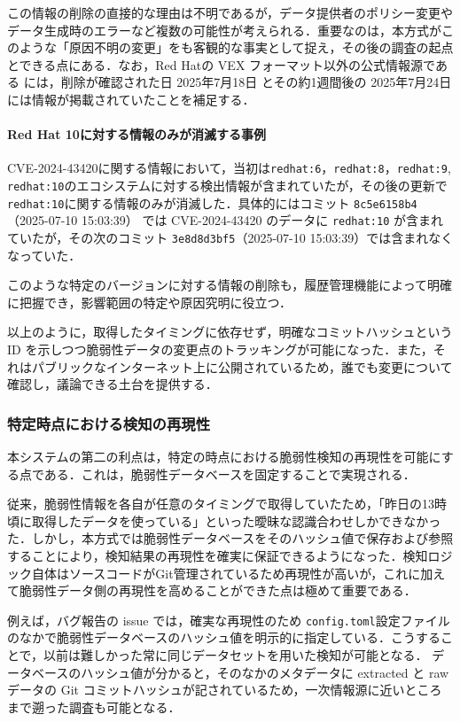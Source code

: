 この情報の削除の直接的な理由は不明であるが，データ提供者のポリシー変更やデータ生成時のエラーなど複数の可能性が考えられる．重要なのは，本方式がこのような「原因不明の変更」をも客観的な事実として捉え，その後の調査の起点とできる点にある．なお，Red Hatの VEX フォーマット以外の公式情報源である \cite{rh-cve-2024-24791-1} \cite{rh-cve-2024-24791-2} には，削除が確認された日 2025年7月18日 とその約1週間後の 2025年7月24日には情報が掲載されていたことを補足する．

\paragraph{Red Hat 10に対する情報のみが消滅する事例}
CVE-2024-43420に関する情報において，当初は\texttt{redhat:6}，\texttt{redhat:8}，\texttt{redhat:9}, \texttt{redhat:10}のエコシステムに対する検出情報が含まれていたが，その後の更新で\texttt{redhat:10}に関する情報のみが消滅した．具体的にはコミット \texttt{8c5e6158b4}（2025-07-10 15:03:39） では CVE-2024-43420 のデータに \texttt{redhat:10} が含まれていたが，その次のコミット \texttt{3e8d8d3bf5}（2025-07-10 15:03:39）では含まれなくなっていた．

このような特定のバージョンに対する情報の削除も，履歴管理機能によって明確に把握でき，影響範囲の特定や原因究明に役立つ．

以上のように，取得したタイミングに依存せず，明確なコミットハッシュという ID を示しつつ脆弱性データの変更点のトラッキングが可能になった．また，それはパブリックなインターネット上に公開されているため，誰でも変更について確認し，議論できる土台を提供する．

\subsubsection{特定時点における検知の再現性}

本システムの第二の利点は，特定の時点における脆弱性検知の再現性を可能にする点である．これは，脆弱性データベースを固定することで実現される．

従来，脆弱性情報を各自が任意のタイミングで取得していたため，「昨日の13時頃に取得したデータを使っている」といった曖昧な認識合わせしかできなかった．しかし，本方式では脆弱性データベースをそのハッシュ値で保存および参照することにより，検知結果の再現性を確実に保証できるようになった．検知ロジック自体はソースコードがGit管理されているため再現性が高いが，これに加えて脆弱性データ側の再現性を高めることができた点は極めて重要である．

例えば，バグ報告の issue \cite{issue-2198}では，確実な再現性のため \texttt{config.toml}設定ファイルのなかで脆弱性データベースのハッシュ値を明示的に指定している．こうすることで，以前は難しかった常に同じデータセットを用いた検知が可能となる．
データベースのハッシュ値が分かると，そのなかのメタデータに extracted と raw データの Git コミットハッシュが記されているため，一次情報源に近いところまで遡った調査も可能となる．

